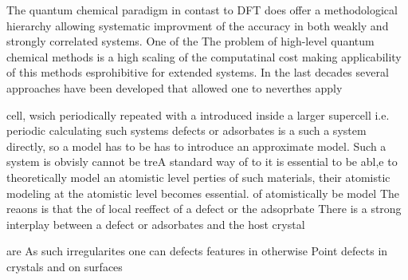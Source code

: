 \documentclass[a4paper,11pt,headings=normal]{scrartcl}
\begin{document}
The quantum chemical paradigm in contast to DFT does offer a methodological hierarchy allowing systematic improvment of the accuracy in both weakly and strongly correlated systems. One of the The problem of high-level quantum chemical methods is a high scaling of the computatinal cost making applicability of this methods esprohibitive for extended systems. In the last  decades several approaches have been developed that allowed one to neverthes apply 

cell, wsich periodically repeated with a introduced inside a larger supercell  i.e. periodic    calculating such systems  defects or adsorbates is a  such a system directly, so a model has to be  has to introduce an approximate model.  Such a system is obvisly cannot be treA standard way of   to it is essential to be abl,e to theoretically model an atomistic level perties of such materials, their atomistic modeling at the atomistic level becomes essential. of  atomistically be model      The reaons is that the  of      local reeffect of a defect or the adsoprbate  There is a strong interplay between a defect or adsorbates and the host crystal 



are   As such irregularites one can defects      features in otherwise Point defects in crystals and on surfaces  
\end{document}
